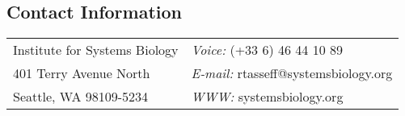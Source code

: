 \documentclass[margin,line]{res}
\begin{document}

\begin{resume}
\section{\sc Contact Information}
\vspace{.05in}
\begin{tabular}{@{}p{3in}p{4in}}
Institute for Systems Biology & {\it Voice:}  (+33 6) 46 44 10 89  \\            
401 Terry Avenue North   & {\it E-mail:}  rtasseff@systemsbiology.org   \\         
Seattle, WA 98109-5234 & {\it WWW:} systemsbiology.org\\         
\end{tabular}

%



\end{resume}
\end{document}
